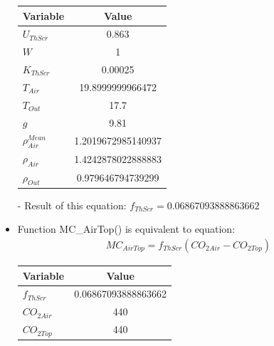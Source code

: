 \documentclass[a4paper]{article}
\numberwithin{equation}{section}
\begin{document}
\begin{itemize}
        \begin{table}[H]
          \centering
          \begin{tabular}{@{}lS[table-format=2.16]@{}}
            \toprule
            \textbf{Variable}     & \textbf{Value}     \\
            \midrule
            \(U_{ThScr}\)         & 0.863              \\
            \(W\)                 & 1                  \\            %
            \(K_{ThScr}\)         & 0.00025            \\
            \(T_{Air}\)           & 19.8999999966472   \\
            \(T_{Out}\)           & 17.7               \\
            \(g\)                 & 9.81               \\
            \(\rho^{Mean}_{Air}\) & 1.2019672985140937 \\
            \(\rho_{Air}\)        & 1.4242878022888883 \\
            \(\rho_{Out}\)        & 0.979646794739299  \\
            \bottomrule
          \end{tabular}
        \end{table}

  \item[-] Result of this equation: \(f_{ThScr} = 0.06867093888863662\)

  \item Function MC\_AirTop() is equivalent to equation:
        \begin{align*}
          MC_{AirTop} = f_{ThScr} (CO_{2 Air} - CO_{2 Top})
        \end{align*}

        \begin{table}[H]
          \centering
          \begin{tabular}{@{}lS[table-format=3.16]@{}}
            \toprule
            \textbf{Variable} & \textbf{Value}      \\
            \midrule
            \(f_{ThScr}\)     & 0.06867093888863662 \\
            \(CO_{2 Air}\)    & 440                 \\
            \(CO_{2 Top}\)    & 440                 \\
            \bottomrule
          \end{tabular}
        \end{table}


\end{itemize}
\end{document}
